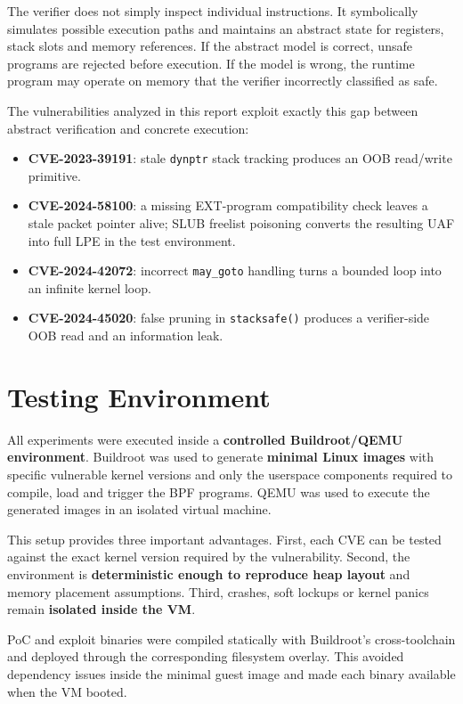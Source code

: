 \documentclass{report}
\begin{document}
    The verifier does not simply inspect individual instructions. It symbolically simulates possible execution paths and maintains an abstract state for registers, stack slots and memory references. If the abstract model is correct, unsafe programs are rejected before execution. If the model is wrong, the runtime program may operate on memory that the verifier incorrectly classified as safe.

    The vulnerabilities analyzed in this report exploit exactly this gap between abstract verification and concrete execution:

    \begin{itemize}
        \item \textbf{CVE-2023-39191}: stale \texttt{dynptr} stack tracking produces an OOB read/write primitive.
        \item \textbf{CVE-2024-58100}: a missing EXT-program compatibility check leaves a stale packet pointer alive; SLUB freelist poisoning converts the resulting UAF into full LPE in the test environment.
        \item \textbf{CVE-2024-42072}: incorrect \texttt{may\_goto} handling turns a bounded loop into an infinite kernel loop.
        \item \textbf{CVE-2024-45020}: false pruning in \texttt{stacksafe()} produces a verifier-side OOB read and an information leak.
    \end{itemize}

    \section{Testing Environment}

    All experiments were executed inside a \textbf{controlled Buildroot/QEMU environment}. Buildroot was used to generate \textbf{minimal Linux images} with specific vulnerable kernel versions and only the userspace components required to compile, load and trigger the BPF programs. QEMU was used to execute the generated images in an isolated virtual machine.

    This setup provides three important advantages. First, each CVE can be tested against the exact kernel version required by the vulnerability. Second, the environment is \textbf{deterministic enough to reproduce heap layout} and memory placement assumptions. Third, crashes, soft lockups or kernel panics remain \textbf{isolated inside the VM}.

    PoC and exploit binaries were compiled statically with Buildroot's cross-toolchain and deployed through the corresponding filesystem overlay. This avoided dependency issues inside the minimal guest image and made each binary available when the VM booted.
\end{document}
